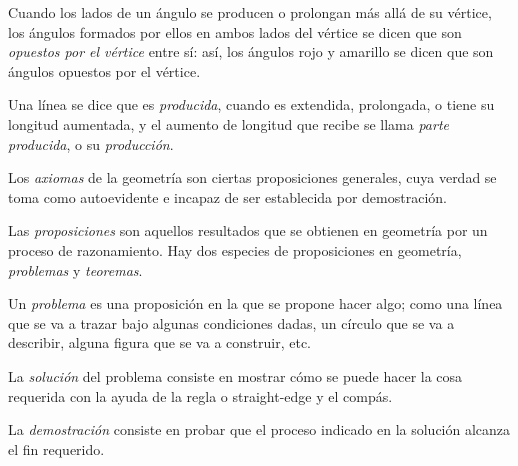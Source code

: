 \documentclass[booklanguage=english]{byrnebook}
\begin{document}
Cuando los lados de un ángulo se producen o prolongan más allá de su vértice, los ángulos formados por ellos en ambos lados del vértice se dicen que son \emph{opuestos por el vértice} entre sí: así, los ángulos rojo y amarillo se dicen que son ángulos opuestos por el vértice.


Una línea se dice que es \emph{producida}, cuando es extendida, prolongada, o tiene su longitud aumentada, y el aumento de longitud que recibe se llama \emph{parte producida}, o su \emph{producción}.



Los \emph{axiomas} de la geometría son ciertas proposiciones generales, cuya verdad se toma como autoevidente e incapaz de ser establecida por demostración.

Las \emph{proposiciones} son aquellos resultados que se obtienen en geometría por un proceso de razonamiento. Hay dos especies de proposiciones en geometría, \emph{problemas} y \emph{teoremas}.

Un \emph{problema} es una proposición en la que se propone hacer algo; como una línea que se va a trazar bajo algunas condiciones dadas, un círculo que se va a describir, alguna figura que se va a construir, etc.

La \emph{solución} del problema consiste en mostrar cómo se puede hacer la cosa requerida con la ayuda de la regla o straight-edge y el compás.

La \emph{demostración} consiste en probar que el proceso indicado en la solución alcanza el fin requerido.
\end{document}
